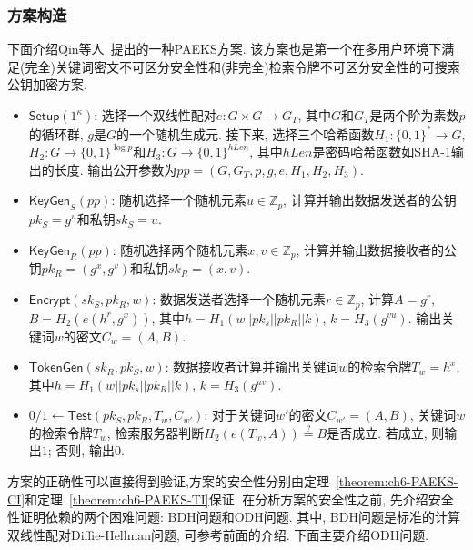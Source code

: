 \subsubsection{方案构造}
下面介绍Qin等人~\cite{QCZZ-ProvSec-2021}提出的一种PAEKS方案. 该方案也是第一个在多用户环境下满足(完全)关键词密文不可区分安全性和(非完全)检索令牌不可区分安全性的可搜索公钥加密方案.

\begin{construction}\label{construction:ch6-QinPAEKS}
\begin{itemize}
\item $\mathsf{Setup}(1^\kappa)$: 选择一个双线性配对$e: G\times G\rightarrow G_T$, 其中$G$和$G_T$是两个阶为素数$p$的循环群, $g$是$G$的一个随机生成元. 接下来, 选择三个哈希函数$H_1: \{0, 1\}^* \rightarrow  G$, $H_2: G \rightarrow \{0, 1\}^{\log p}$和$H_3: G \rightarrow \{0, 1\}^{hLen}$, 其中$hLen$是密码哈希函数如SHA-1输出的长度. 输出公开参数为$pp = (G, G_T, p, g, e, H_1, H_2, H_3)$.


\item $\mathsf{KeyGen}_S(pp)$: 随机选择一个随机元素$u \in \mathbb{Z}_p$, 计算并输出数据发送者的公钥$pk_S = g^u$和私钥$sk_S=u$. 

\item $\mathsf{KeyGen}_R(pp)$: 随机选择两个随机元素$x, v \in \mathbb{Z}_p$, 计算并输出数据接收者的公钥$pk_R=(g^x, g^v)$和私钥$sk_R=(x, v)$.

\item $\mathsf{Encrypt}(sk_S, pk_R, w)$: 数据发送者选择一个随机元素$r \in \mathbb{Z}_p$, 计算$A = g^r$, $B = H_2(e(h^r, g^x))$, 其中$h = H_1(w||pk_s||pk_R||k)$, $k = H_3(g^{vu})$. 输出关键词$w$的密文$C_w = (A, B)$.

\item $\mathsf{TokenGen}(sk_R, pk_S, w)$: 数据接收者计算并输出关键词$w$的检索令牌$T_w = h^x$, 其中$h = H_1(w||pk_s||pk_R||k)$, $k = H_3(g^{uv})$. 

\item $0/1 \gets \mathsf{Test}(pk_S, pk_R, T_w, C_{w'})$: 对于关键词$w'$的密文$C_{w'} = (A, B)$, 关键词$w$的检索令牌$T_w$, 检索服务器判断$H_2(e(T_w, A))\overset{?}{=} B$是否成立. 若成立, 则输出$1$; 否则, 输出$0$.
\end{itemize}
\end{construction}

方案的正确性可以直接得到验证,方案的安全性分别由定理~\ref{theorem:ch6-PAEKS-CI}和定理~\ref{theorem:ch6-PAEKS-TI}保证. 在分析方案的安全性之前, 先介绍安全性证明依赖的两个困难问题: BDH问题和ODH问题. 其中, BDH问题是标准的计算双线性配对Diffie-Hellman问题, 可参考前面的介绍. 下面主要介绍ODH问题. 

